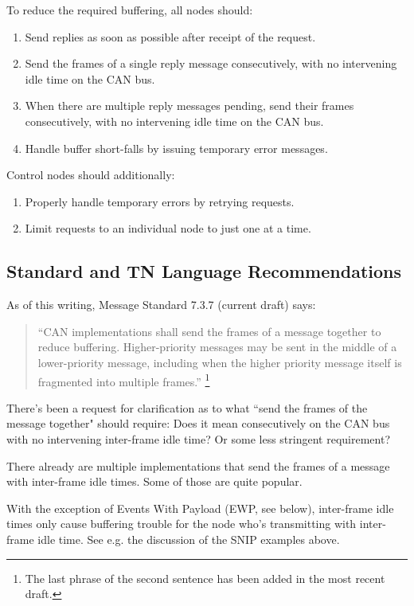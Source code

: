\documentclass[11pt]{article}
\begin{document}
To reduce the required buffering, all nodes should:
\begin{enumerate}
\item Send replies as soon as possible after receipt of the request.
\item Send the frames of a single reply message consecutively, with no intervening idle 
    time on the CAN bus.
\item When there are multiple reply messages pending, send their frames 
    consecutively, with no intervening idle time on the CAN bus.
\item Handle buffer short-falls by issuing temporary error messages.
\end{enumerate}

Control nodes should additionally:
\begin{enumerate}
\item Properly handle temporary errors by retrying requests.
\item Limit requests to an individual node to just one at a time.
\end{enumerate}


\subsection{Standard and TN Language Recommendations}\label{standard_language}

As of this writing, Message Standard 7.3.7 (current draft) says: 
\begin{quote}
    ``CAN implementations shall send the frames of a message together to reduce buffering. 
    Higher-priority messages may be sent in the middle of a lower-priority message, 
    including when the higher priority message itself is fragmented into multiple frames.” 
    \footnote{The last phrase of the second sentence has been added in the most recent draft.}  
\end{quote}

There's been a request for clarification as to what
``send the frames of the message together" should require:
Does it mean consecutively on the CAN bus with no intervening inter-frame idle time?
Or some less stringent requirement?

There already are multiple implementations that send the frames of a message
with inter-frame idle times.  Some of those are quite popular.  

With the exception of Events With Payload (EWP, see below), inter-frame idle times
only cause buffering trouble for the node who's transmitting with
inter-frame idle time. 
See e.g. the discussion of the SNIP examples above. 
\end{document}
